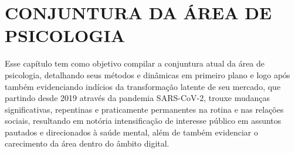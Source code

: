 \chapter{CONJUNTURA DA ÁREA DE PSICOLOGIA}
\label{chap:conjunturaPsicologia}

Esse capítulo tem como objetivo compilar a conjuntura atual da área de psicologia, detalhando seus métodos e dinâmicas em primeiro plano e logo após também  evidenciando indícios da transformação latente de seu mercado, que partindo desde 2019 através da pandemia SARS-CoV-2, trouxe mudanças significativas, repentinas e praticamente permanentes na rotina e nas relações sociais, resultando em notória intensificação de interesse público em assuntos pautados e direcionados à saúde mental, além de também evidenciar o carecimento da área dentro do âmbito digital.




